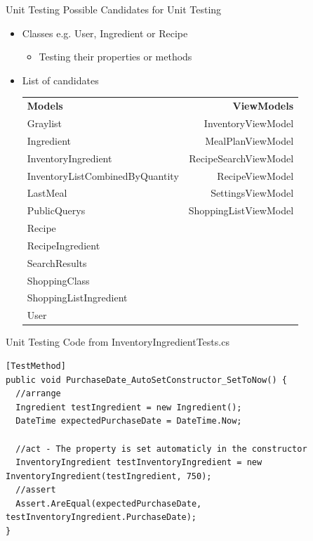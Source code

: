 \begin{frame}[fragile] {Unit Testing} {Possible Candidates for Unit Testing}

	\begin{itemize}
		\item Classes e.g. User, Ingredient or Recipe
			\begin{itemize}
				\item Testing their properties or methods
			\end{itemize}
		\item List of candidates	 	
				{\small
				\begin{tabular} {l r}
							\textbf{Models} & \textbf{ViewModels} \\
							Graylist & {\color{blue} InventoryViewModel} \\
							Ingredient & MealPlanViewModel \\
							{\color{blue}InventoryIngredient} & RecipeSearchViewModel \\
							InventoryListCombinedByQuantity & RecipeViewModel \\
							LastMeal & SettingsViewModel \\
							PublicQuerys & ShoppingListViewModel \\
							Recipe \\
							RecipeIngredient \\
							SearchResults \\
							ShoppingClass \\
							ShoppingListIngredient \\
							User
				\end{tabular}
				}					
	\end{itemize}
		
\end{frame}

\begin{frame}[fragile] {Unit Testing} {Code from InventoryIngredientTests.cs}
		
\begin{lstlisting}
[TestMethod]
public void PurchaseDate_AutoSetConstructor_SetToNow() {
  //arrange
  Ingredient testIngredient = new Ingredient();
  DateTime expectedPurchaseDate = DateTime.Now;

  //act - The property is set automaticly in the constructor
  InventoryIngredient testInventoryIngredient = new InventoryIngredient(testIngredient, 750);
  //assert
  Assert.AreEqual(expectedPurchaseDate, testInventoryIngredient.PurchaseDate); 
}
\end{lstlisting}
	
\end{frame}


